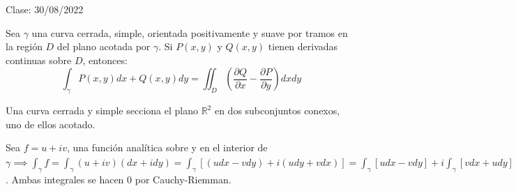 Clase: 30/08/2022

\begin{teorema}[Green]
    Sea $\gamma$ una curva cerrada, simple, orientada positivamente y suave por tramos en la región $D$ del plano acotada por $\gamma$. Si $P(x,y)$ y $Q(x,y)$ tienen derivadas continuas sobre $D$, entonces: 
    $$\int_\gamma P(x,y)dx+Q(x,y)dy=\iint_D\left(\frac{\partial Q}{\partial x}-\frac{\partial P}{\partial y}\right)dxdy$$
\end{teorema}

\begin{teorema}
    Una curva cerrada y simple secciona el plano $\mathbb{R}^2$ en dos subconjuntos conexos, uno de ellos acotado. 
    \begin{dem}
        Sea $f=u+iv$, una función analítica sobre y en el interior de $\gamma\implies \int_\gamma f = \int_\gamma (u+iv)(dx+idy)=\int_\gamma[(udx-vdy)+i(udy+vdx)]=\int_\gamma [udx-vdy]+i\int_\gamma[vdx +udy]=\iint_D\left[-\frac{\partial v}{\partial x}-\frac{\partial u}{\partial y}\right]dxdy +i\iint_D\left[\frac{\partial u}{\partial x}-\frac{\partial v}{\partial y}\right]dxdy$. Ambas integrales se hacen 0 por Cauchy-Riemman. 
    \end{dem}
\end{teorema}


